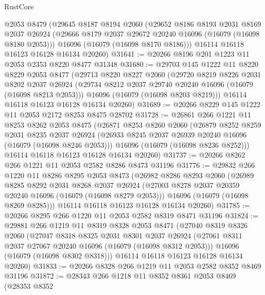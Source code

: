 \begin{lexlean}{RustCore}
\begin{coremodule}
    @2053
    @8479
    (@29645
      @8187
      @8194
      @2060
      (@29652
        @8186
        @8193
        @2031
        @8169
        @2037
        @26924
        (@29666 @8179 @2037 @29672 @20240 @16096 (@16079 (@16098 @8180 @2053)))
        @16096
        (@16079 (@16098 @8170 @8186)))
      @16114
      @16118
      @16123
      @16128
      @16134
      @20260)
@31641 := @20266 @8196 @201 @1223 @11 @2053 @2353 @8220 @8477 @31348
@31680 := @29703
    @145
    @1222
    @11
    @8220
    @8229
    @2053
    @8477
    (@29713
      @8220
      @8227
      @2060
      (@29720
        @8219
        @8226
        @2031
        @8202
        @2037
        @26924
        (@29734 @8212 @2037 @29740 @20240 @16096 (@16079 (@16098 @8213 @2053)))
        @16096
        (@16079 (@16098 @8203 @8219)))
      @16114
      @16118
      @16123
      @16128
      @16134
      @20260)
@31689 := @20266 @8229 @145 @1222 @11 @2053 @2172 @8253 @8475 @28702
@31728 := @26861
    @266
    @1221
    @11
    @8253
    @8262
    @2053
    @8475
    (@26871
      @8253
      @8260
      @2060
      (@26879
        @8252
        @8259
        @2031
        @8235
        @2037
        @26924
        (@26933 @8245 @2037 @26939 @20240 @16096 (@16079 (@16098 @8246 @2053)))
        @16096
        (@16079 (@16098 @8236 @8252)))
      @16114
      @16118
      @16123
      @16128
      @16134
      @20260)
@31737 := @20266 @8262 @266 @1221 @11 @2053 @2582 @8286 @8473 @31196
@31776 := @29832
    @266
    @1220
    @11
    @8286
    @8295
    @2053
    @8473
    (@26982
      @8286
      @8293
      @2060
      (@26989
        @8285
        @8292
        @2031
        @8268
        @2037
        @26924
        (@27003 @8278 @2037 @20359 @20240 @16096 (@16079 (@16098 @8279 @2053)))
        @16096
        (@16079 (@16098 @8269 @8285)))
      @16114
      @16118
      @16123
      @16128
      @16134
      @20260)
@31785 := @20266 @8295 @266 @1220 @11 @2053 @2582 @8319 @8471 @31196
@31824 := @29881
    @266
    @1219
    @11
    @8319
    @8328
    @2053
    @8471
    (@27040
      @8319
      @8326
      @2060
      (@27047
        @8318
        @8325
        @2031
        @8301
        @2037
        @26924
        (@27061 @8311 @2037 @27067 @20240 @16096 (@16079 (@16098 @8312 @2053)))
        @16096
        (@16079 (@16098 @8302 @8318)))
      @16114
      @16118
      @16123
      @16128
      @16134
      @20260)
@31833 := @20266 @8328 @266 @1219 @11 @2053 @2582 @8352 @8469 @31196
@31872 := @28343
    @266
    @1218
    @11
    @8352
    @8361
    @2053
    @8469
    (@28353
      @8352

\end{coremodule}
\end{lexlean}
